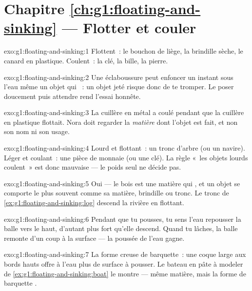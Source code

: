 \section*{Chapitre \ref{ch:g1:floating-and-sinking} --- Flotter et couler}

\begin{solution}{exo:g1:floating-and-sinking:1}
Flottent~: le bouchon de liège, la brindille sèche, le canard en
plastique. Coulent~: la clé, la bille, la pierre.
\end{solution}

\begin{solution}{exo:g1:floating-and-sinking:2}
Une éclaboussure peut enfoncer un instant sous l'eau même un objet
qui ~: un objet jeté risque donc de te tromper. Le poser
doucement puis attendre rend l'essai honnête.
\end{solution}

\begin{solution}{exo:g1:floating-and-sinking:3}
La cuillère en métal a coulé pendant que la cuillère en plastique
flottait. Nora doit regarder la \emph{matière} dont l'objet est fait,
et non son nom ni son usage.
\end{solution}

\begin{solution}{exo:g1:floating-and-sinking:4}
Lourd et flottant~: un tronc d'arbre (ou un navire). Léger et
coulant~: une pièce de monnaie (ou une clé). La règle «~les objets
lourds coulent~» est donc mauvaise --- le poids seul ne décide pas.
\end{solution}

\begin{solution}{exo:g1:floating-and-sinking:5}
Oui --- le bois est une matière qui , et un objet se comporte
le plus souvent comme sa matière, brindille ou tronc. Le tronc de
\cref{ex:g1:floating-and-sinking:log} descend la rivière en flottant.
\end{solution}

\begin{solution}{exo:g1:floating-and-sinking:6}
Pendant que tu pousses, tu sens l'eau repousser la balle vers le
haut, d'autant plus fort qu'elle descend. Quand tu lâches, la balle
remonte d'un coup à la surface --- la poussée de l'eau gagne.
\end{solution}

\begin{solution}{exo:g1:floating-and-sinking:7}
La forme creuse de barquette~: une coque large aux bords hauts offre
à l'eau plus de surface à pousser. Le bateau en pâte à modeler de
\cref{ex:g1:floating-and-sinking:boat} le montre --- même matière,
mais la forme de barquette .
\end{solution}

